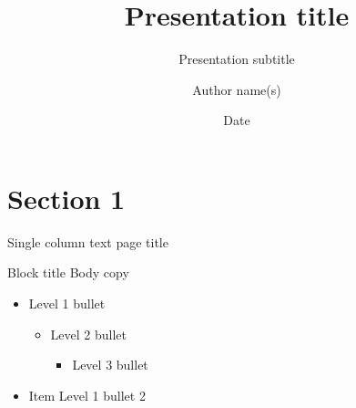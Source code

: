 \documentclass[t]{beamer}
\title{Presentation title}
\subtitle{Presentation subtitle}
\date{Date}
\author{Author name(s)}
\begin{document}
\begin{frame}
	\titlepage
\end{frame}

\begin{frame}
	\imprintpage
\end{frame}

\section{Section 1}

\begin{frame}{Single column text page title}
	\begin{block}{Block title}
  		Body copy
  		\begin{itemize}    
  			\item Level 1 bullet
			\begin{itemize}
					\item Level 2 bullet
					\begin{itemize}
						\item Level 3 bullet
					\end{itemize}
			\end{itemize}
  			\item Item Level 1 bullet 2
  		\end{itemize}    
	\end{block}
\end{frame}
\end{document}
